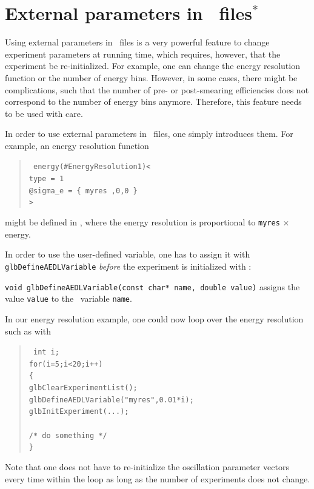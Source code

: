 \section{External parameters in \AEDL\ files$^*$}
\label{sec:aedlparams}

Using external parameters in \AEDL\ files is a very powerful feature
to change experiment parameters at running time, which requires, however, that
the experiment be re-initialized. For example, one can change the
energy resolution function or the number of energy bins. However,
in some cases, there might be complications, such that the number
of pre- or post-smearing efficiencies does not correspond to the number
of energy bins anymore. Therefore, this feature needs to be 
used with care.

In order to use external parameters in \AEDL\ files, one simply
introduces them. For example, an energy resolution function
\begin{quote}
{\tt
energy(\#EnergyResolution1)< \\
\hspace*{1cm} type = 1 \\
\hspace*{1cm} @sigma\_e = \{ myres ,0,0 \} \\
> \\
}
\end{quote}
might be defined in \AEDL , where the energy resolution is proportional
to {\tt myres} $\times$ energy. 

In order to use the user-defined variable, one has to assign it 
with {\tt glbDefineAEDLVariable} {\em before} the experiment is initialized with :
\begin{function}
{\tt void glbDefineAEDLVariable(const char* name, double value)}
assigns the value {\tt value} to the \AEDL\ variable {\tt name}.
\end{function}
In our energy resolution example, one could now loop over the
energy resolution such as with
\begin{quote}
{\tt
int i; \\
for(i=5;i<20;i++) \\
\{ \\    
\hspace*{1cm} glbClearExperimentList(); \\
\hspace*{1cm} glbDefineAEDLVariable("myres",0.01*i); \\
\hspace*{1cm} glbInitExperiment(...); \\
\\
\hspace*{1cm} /* do something */ \\
\}
}
\end{quote}
Note that one does not have to re-initialize the oscillation
parameter vectors every time within the loop as long as the
number of experiments does not change.

